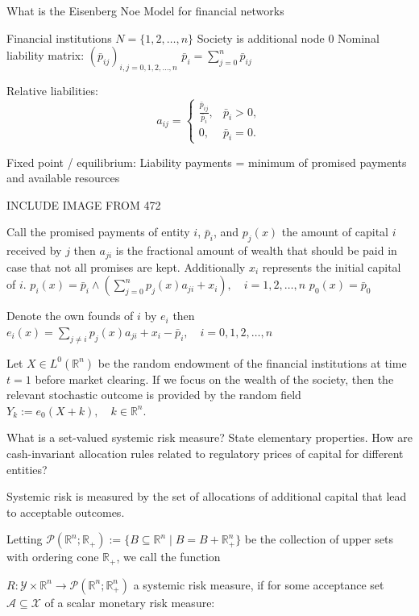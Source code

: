 What is the Eisenberg Noe Model for financial networks

Financial institutions \( N = \{ 1, 2, \ldots, n \} \)
Society is additional node \( 0 \)
Nominal liability matrix: \( (\bar{p}_{ij})_{i,j=0,1,2,\ldots,n} \)
\(
\bar{p}_i = \sum_{j=0}^{n} \bar{p}_{ij}
\)

Relative liabilities:
\[
a_{ij} = 
\begin{cases} 
\frac{\bar{p}_{ij}}{\bar{p}_i}, & \bar{p}_i > 0, \\ 
0, & \bar{p}_i = 0.
\end{cases}
\]

Fixed point / equilibrium:
Liability payments
=
minimum of promised payments and
available resources

INCLUDE IMAGE FROM 472

Call the promised payments of entity \( i \), \( \bar{p}_i \), and \( p_j(x) \) the amount of capital \( i \) received by \( j \)
then \( a_{ji} \) is the fractional amount of wealth that should be paid in case that not all promises are kept.
Additionally \( x_i \) represents the initial capital of \( i \).
\(p_i(x) = \bar{p}_i \wedge \left( \sum_{j=0}^n p_j(x) a_{ji} + x_i \right), \quad i = 1, 2, \ldots, n \)
\( p_0(x) = \bar{p}_0 \)

Denote the own founds of \( i \) by \( e_i \) then
\( e_i(x) = \sum_{j \neq i} p_j(x) a_{ji} + x_i - \bar{p}_i, \quad i = 0, 1, 2, \ldots, n \)

Let \( X \in L^0(\mathbb{R}^n) \) be the random endowment of the financial institutions at time \( t = 1 \) before market clearing.
If we focus on the wealth of the society, then the relevant stochastic outcome is provided by the random field
\( Y_k := e_0(X + k), \quad k \in \mathbb{R}^n. \)


What is a set-valued systemic risk measure? State elementary properties. How are
cash-invariant allocation rules related to regulatory prices of capital for different
entities?

Systemic risk is measured by the set of allocations of additional capital that lead to acceptable outcomes.

Letting \(\mathcal{P}(\mathbb{R}^n; \mathbb{R}_+) := \{ B \subseteq \mathbb{R}^n \mid B = B + \mathbb{R}^n_+ \}\) 
be the collection of upper sets with ordering cone \(\mathbb{R}_+\), we call the function 

\(R: \mathcal{Y} \times \mathbb{R}^n \to \mathcal{P}(\mathbb{R}^n; \mathbb{R}_+^n)\)
a systemic risk measure, if for some acceptance set \(\mathcal{A} \subseteq \mathcal{X}\) of a scalar monetary risk measure:

